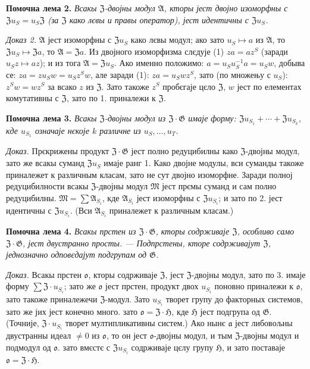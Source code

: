 \documentclass[11pt]{article}
\begin{document}
\noindent\textbf{Помочна лема 2.} \emph{Всакы \(\mathfrak Z\)-двојны модул \(\mathfrak A\), кторы јест двојно изоморфны с \(\mathfrak Zu_S=u_S\mathfrak Z\) (за \(\mathfrak Z\) како лєвы и правы оператор), јест идентичны с \(\mathfrak Zu_S\).}

\noindent\emph{Доказ 2.} \(\mathfrak A\) јест изоморфны с \(\mathfrak Zu_S\) како лєвы модул; ако зато \(u_S\mapsto a\) из \(\mathfrak A\), то \(\mathfrak Zu_S\mapsto\mathfrak Za\), то \(\mathfrak A=\mathfrak Za\). Из двојного изоморфизма слєдује (1) \(za=az^S\) (заради \(u_Sz\mapsto az\)); и из тога \(\mathfrak A=\mathfrak Zu_S\). Ако именно положимо: \(a=u_Su_S^{-1}a=u_Sw\), добыва се: \(za=zu_Sw=u_Sz^Sw\), але заради (1): \(za=u_Swz^S\), зато (по множењу с \(u_S\)): \(z^Sw=wz^S\) за всако \(z\) из \(\mathfrak Z\). Зато такоже \(z^S\) пробєгаје цєло \(\mathfrak Z\), \(w\) јест по елементах комутативны с \(\mathfrak Z\), зато по 1. приналежи к \(\mathfrak Z\).

\noindent\textbf{Помочна лема 3.} \emph{Всакы \(\mathfrak Z\)-двојны модул из \(\mathfrak Z\cdot\mathfrak G\) имаје форму: \(\mathfrak Zu_{S_1}+\cdots+\mathfrak Zu_{S_k}\), кде \(u_{S_1}\) означаје нєкоје \(k\) различне из \(u_S,\ldots,u_T\).}

\noindent\emph{Доказ.} Прєкрижены продукт \(\mathfrak Z\cdot\mathfrak G\) јест полно редуцибилны како \(\mathfrak Z\)-двојны модул, зато же всакы суманд \(\mathfrak Zu_S\) имаје ранг 1. Како двојне модулы, вси суманды такоже приналежет к различным класам, зато не сут двојно изоморфне. Заради полној редуцибилности всакы \(\mathfrak Z\)-двојны модул \(\mathfrak M\) јест прємы суманд и сам полно редуцибилны. \(\mathfrak M=\sum\mathfrak A_{S_i}\), кде \(\mathfrak A_{S_i}\) јест изоморфны с \(\mathfrak Zu_{S_i}\); и зато по 2. јест идентичны с \(\mathfrak Zu_{S_i}\). (Вси \(\mathfrak A_{S_i}\) приналежет к различным класам.)

\noindent\textbf{Помочна лема 4.} \emph{Всакы прстен из \(\mathfrak Z\cdot\mathfrak G\), кторы содрживаје \(\mathfrak Z\), особливо само \(\mathfrak Z\cdot\mathfrak G\), јест двустранно просты. --- Подпрстены, кторе содрживајут \(\mathfrak Z\), једнозначно одповєдајут подгрупам од \(\mathfrak G\).}

\noindent\emph{Доказ.} Всакы прстен \(\mathfrak o\), кторы содрживаје \(\mathfrak Z\), јест \(\mathfrak Z\)-двојны модул, зато по 3. имаје форму \(\sum\mathfrak Z\cdot u_{S_i}\); зато же \(\mathfrak o\) јест прстен, продукт двох \(u_{S_i}\) поновно приналежи к \(\mathfrak o\), зато такоже приналежечи \(\mathfrak Z\)-модул. Зато \(u_{S_i}\) творет групу до факторных системов, зато же јих јест конечно много. зато \(\mathfrak o=\mathfrak Z\cdot\mathfrak H\), кде \(\mathfrak H\) јест подгрупа од \(\mathfrak G\). (Точније, \(\mathfrak Z\cdot u_{S_i}\) творет мултипликативны систем.) Ако нынє \(\mathfrak a\) јест либовољны двустранны идеал \(\neq0\) из \(\mathfrak o\), то он јест \(\mathfrak o\)-двојны модул, и тым \(\mathfrak Z\)-двојны модул и подмодул од \(\mathfrak o\). зато вмєстє с \(\mathfrak Zu_{S_i}\) содрживаје цєлу групу \(\mathfrak H\), и зато поставаје \(\mathfrak o=\mathfrak Z\cdot\mathfrak H\).
\end{document}
